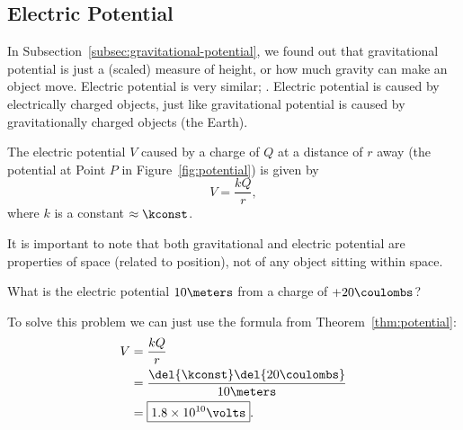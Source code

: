 \documentclass[12pt,paper=letter]{scrartcl}
\begin{document}
    \subsection{Electric Potential}\label{subsec:electric-potential}
    In Subsection~\ref{subsec:gravitational-potential},
    we found out that gravitational potential is just a (scaled) measure of height, or how much gravity can make an object move.
    Electric potential is very similar; .
    \pnp
    Electric potential is caused by electrically charged objects,
    just like gravitational potential is caused by gravitationally charged objects (the Earth).

    

    \begin{thmboxed}
        \label{thm:potential}
        The electric potential $V$ caused by a charge of $Q$ at a distance of $r$ away
        (the potential at Point $P$ in Figure~\ref{fig:potential}) is given by
        \begin{equation}
            V=\frac{kQ}{r},
            \label{eq:potential}
        \end{equation}
        where $k$ is a constant $\approx\kconst$.
    \end{thmboxed}

    It is important to note that both gravitational and electric potential are properties of space (related to position),
    not of any object sitting within space.


    \begin{exboxed}
        \label{ex:potential_1}
        What is the electric potential $10 \meters$ from a charge of $+20\coulombs$?
    \end{exboxed}

    To solve this problem we can just use the formula from Theorem~\ref{thm:potential}:
    \begin{align*}
        V&=\frac{kQ}{r}\\
        &=\frac{\del{\kconst}\del{20 \coulombs}}{10 \meters}\\
        &=\boxed{1.8\times 10^{10}\volts}.
    \end{align*}
\end{document}
